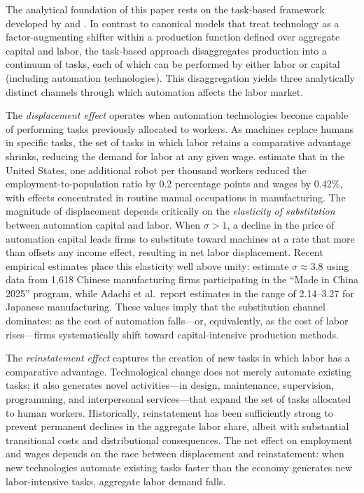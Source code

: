 The analytical foundation of this paper rests on the task-based framework developed by \cite{acemoglu2019automation} and \cite{acemoglu2020robots}. In contrast to canonical models that treat technology as a factor-augmenting shifter within a production function defined over aggregate capital and labor, the task-based approach disaggregates production into a continuum of tasks, each of which can be performed by either labor or capital (including automation technologies). This disaggregation yields three analytically distinct channels through which automation affects the labor market.

The \textit{displacement effect} operates when automation technologies become capable of performing tasks previously allocated to workers. As machines replace humans in specific tasks, the set of tasks in which labor retains a comparative advantage shrinks, reducing the demand for labor at any given wage. \cite{acemoglu2020robots} estimate that in the United States, one additional robot per thousand workers reduced the employment-to-population ratio by 0.2 percentage points and wages by 0.42\%, with effects concentrated in routine manual occupations in manufacturing. The magnitude of displacement depends critically on the \textit{elasticity of substitution} between automation capital and labor. When $\sigma > 1$, a decline in the price of automation capital leads firms to substitute toward machines at a rate that more than offsets any income effect, resulting in net labor displacement. Recent empirical estimates place this elasticity well above unity: \cite{cheng2021elasticity} estimate $\sigma \approx 3.8$ using data from 1,618 Chinese manufacturing firms participating in the ``Made in China 2025'' program, while Adachi et al.\ report estimates in the range of 2.14--3.27 for Japanese manufacturing. These values imply that the substitution channel dominates: as the cost of automation falls---or, equivalently, as the cost of labor rises---firms systematically shift toward capital-intensive production methods.

The \textit{reinstatement effect} captures the creation of new tasks in which labor has a comparative advantage. Technological change does not merely automate existing tasks; it also generates novel activities---in design, maintenance, supervision, programming, and interpersonal services---that expand the set of tasks allocated to human workers. Historically, reinstatement has been sufficiently strong to prevent permanent declines in the aggregate labor share, albeit with substantial transitional costs and distributional consequences. The net effect on employment and wages depends on the race between displacement and reinstatement: when new technologies automate existing tasks faster than the economy generates new labor-intensive tasks, aggregate labor demand falls.

